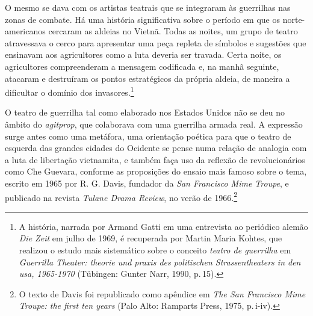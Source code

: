 O mesmo se dava com os artistas teatrais que se integraram às guerrilhas
nas zonas de combate. Há uma história significativa sobre o período em
que os norte-americanos cercaram as aldeias no Vietnã. Todas as noites, 
um grupo de teatro atravessava o cerco para apresentar uma peça
repleta de símbolos e sugestões que ensinavam aos agricultores como a
luta deveria ser travada. Certa noite, os agricultores compreenderam a
mensagem codificada e, na manhã seguinte, atacaram e destruíram os
pontos estratégicos da própria aldeia, de maneira a dificultar o domínio dos
invasores.\footnote{A história, narrada por Armand Gatti em uma
  entrevista ao periódico alemão {\it Die Zeit} em julho de 1969, é
  recuperada por Martin Maria Kohtes, que realizou o estudo mais
  sistemático sobre o conceito {\it teatro de guerrilha} em
  {\it Guerrilla Theater: theorie und praxis des politischen
  Strassentheaters in den {\sc usa}, 1965-1970} (Tübingen: Gunter Narr,
  1990, p.\,15).}

\subject{Conceito estadunidense de Teatro de guerrilha}

O teatro de guerrilha tal como elaborado nos Estados Unidos não se
deu no âmbito do {\it agitprop}, que colaborava com uma guerrilha armada
real. A expressão surge antes como uma metáfora, uma orientação poética
para que o teatro de esquerda das grandes cidades do Ocidente se pense
numa relação de analogia com a luta de libertação vietnamita, e também
faça uso da reflexão de revolucionários como Che Guevara, conforme as
proposições do ensaio mais famoso sobre o tema, escrito em 1965 por R.
G. Davis, fundador da {\it San Francisco Mime Troupe}, e publicado na
revista {\it Tulane Drama Review}, no verão de 1966.\footnote{O texto de
  Davis foi republicado como apêndice em {\it The San Francisco Mime
  Troupe: the first ten years} (Palo Alto: Ramparts Press, 1975, p.\,i-iv).}


